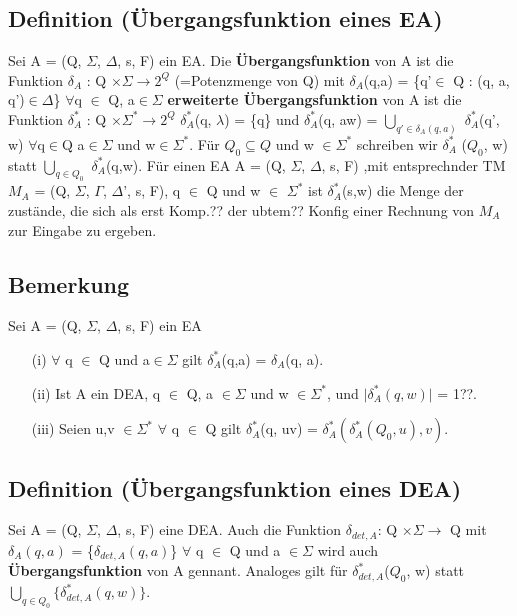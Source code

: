 \documentclass[a4paper,11pt]{article}
\begin{document}
\subsection{Definition (Übergangsfunktion eines EA)}
Sei A = (Q, $\Sigma$, $\Delta$, s, F) ein EA. Die \textbf{Übergangsfunktion} von A ist die Funktion $\delta_{A}$ : Q $\times \Sigma\rightarrow 2^{Q}$ (=Potenzmenge von Q) mit $\delta_{A}$(q,a) = \{q'$\in$ Q : (q, a, q')$\in \Delta$\} $\forall$q $\in$ Q, a$\in \Sigma$ \textbf{erweiterte Übergangsfunktion} von A ist die Funktion $\delta_{A}^{*}$ : Q $\times \Sigma^{*} \rightarrow 2^{Q}$ $\delta_{A}^{*}$(q, $\lambda$) = \{q\} und $\delta_{A}^{*}$(q, aw) = $\bigcup \limits_{q'\in \delta_{A}(q,a)}$ $\delta_{A}^{*}$(q', w) $\forall$q$\in$Q a$\in \Sigma$ und w$\in \Sigma^{*}$. Für $Q_{0} \subseteq Q$ und w $\in \Sigma^{*}$ schreiben wir $\delta_{A}^{*}$ ($Q_{0}$, w) statt $\bigcup \limits_{q \in Q_{0}}$ $\delta_{A}^{*}$(q,w). Für einen EA A = (Q, $\Sigma$, $\Delta$, s, F) ,mit entsprechnder TM $M_{A}$ = (Q, $\Sigma$, $\Gamma$, $\Delta$', s, F), q $\in$ Q und w $\in$ $\Sigma^{*}$ ist $\delta_{A}^{*}$(s,w) die Menge der zustände, die sich als erst Komp.?? der ubtem?? Konfig einer Rechnung von $M_{A}$ zur Eingabe zu ergeben.

\subsection{Bemerkung }
Sei A = (Q, $\Sigma$, $\Delta$, s, F) ein EA
\begin{itemize}
    \item [(i)] $\forall$ q $\in$ Q und a$\in \Sigma$ gilt $\delta_{A}^{*}$(q,a) = $\delta_{A}$(q, a).
    \item [(ii)] Ist A ein DEA, q $\in$ Q, a $\in \Sigma$ und w $\in \Sigma^{*}$, und $\lvert \delta_{A}^{*}(q,w) \rvert$ = 1??.
    \item[(iii)] Seien u,v $\in \Sigma^{*}$ $\forall$ q $\in$ Q gilt $\delta_{A}^{*}$(q, uv) = $\delta_{A}^{*}(\delta_{A}^{*}(Q_{0}, u), v)$.
\end{itemize}

\subsection{Definition (Übergangsfunktion eines DEA)}
Sei A = (Q, $\Sigma$,  $\Delta$, s, F) eine DEA. Auch die Funktion $\delta_{det, A}$: Q $\times \Sigma \rightarrow$ Q mit $\delta_{A}(q,a)$ = \{$\delta_{det, A}(q, a)$\} $\forall$ q $\in$ Q und a $\in \Sigma$ wird auch \textbf{Übergangsfunktion} von A gennant. Analoges gilt für $\delta_{det, A}^{*}$($Q_{0}$, w) statt $\bigcup \limits_{q \in Q_{0}}\{\delta_{det, A}^{*}(q, w)\}$.
\end{document}

